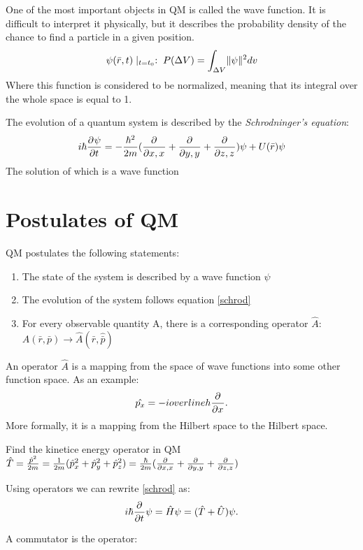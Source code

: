 {
    One of the most important objects in QM is called the wave function. It is difficult to interpret it physically, but it describes the probability density of the chance to find a particle in a given position.
    \begin{equation}
        \psi (\bar{r},t)\mid_{t=t_0}:\; P(\Delta V) = \int_{\Delta V} \lVert\psi\rVert^{2}dv
    \end{equation}
    Where this function is considered to be normalized, meaning that its integral over the whole space is equal to 1.

}

{
    The evolution of a quantum system is described by the \textit{Schrodninger's equation}:
    \begin{equation}
        \label{schrod}
        i\hbar \frac{\partial^{}\psi }{\partial t^{}} = -\frac{\hbar^{2}}{2m}( \frac{\partial^{}}{\partial x,x^{}} + \frac{\partial^{}}{\partial y,y^{}} +\frac{\partial^{}}{\partial z,z^{}})\psi  + U(\bar{r})\psi 
    \end{equation}
    The solution of which is a wave function
}
\clearpage
\section{Postulates of QM}
QM postulates the following statements:
\begin{enumerate}
    \item The state of the system is described by a wave function $\psi $
    \item The evolution of the system follows equation \ref{schrod}
    \item For every observable quantity A, there is a corresponding operator $\hat{A}$:  $A(\bar{r},\bar{p}) \longrightarrow \hat{A}(\hat{\bar{r}},\hat{\bar{p}})$
\end{enumerate}
{
    An operator $\hat{A}$ is a mapping from the space of wave functions into some other function space. As an example:
    \[
        \hat{p_x} = -i\\overline{h} \frac{\partial^{}}{\partial x^{}}
    .\]         
    More formally, it is a mapping from the Hilbert space to the Hilbert space.
}

\qs{}
{
    Find the kinetice energy operator in QM
}
\sol $\hat{T} = \frac{\hat{p}^{2}}{2m} = \frac{1}{2m}(\hat{p}_x^{2} + \hat{p}_y^{2} + \hat{p}_z^{2}) = \frac{ \hbar}{2m}( \frac{\partial^{}}{\partial x,x^{}} + \frac{\partial^{}}{\partial y,y^{}} + \frac{\partial^{}}{\partial z,z^{}}) $ 

\nt
{
    Using operators we can rewrite \ref{schrod} as:
    \[
    i\hbar \frac{\partial^{}}{\partial t^{}}\psi = \hat{H}\psi = (\hat{T}+\hat{U})\psi 
    .\] 
}

{
    A commutator is the operator: 
}

